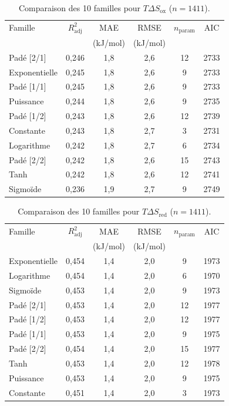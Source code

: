 \begin{table}[htbp]
\centering
\footnotesize
\caption{Comparaison des 10 familles pour $T\Delta S_{\mathrm{ox}}$ ($n = 1411$).}
\label{tab:s4_tds_ox_families}
\begin{tabular}{lccccc}
\toprule
Famille & $R^2_{\mathrm{adj}}$ & MAE & RMSE & $n_{\mathrm{param}}$ & AIC \\
 & & (kJ/mol) & (kJ/mol) & & \\
\midrule
Padé [2/1] & 0,246 & 1,8 & 2,6 & 12 & 2733 \\
Exponentielle & 0,245 & 1,8 & 2,6 & 9 & 2733 \\
Padé [1/1] & 0,245 & 1,8 & 2,6 & 9 & 2733 \\
Puissance & 0,244 & 1,8 & 2,6 & 9 & 2735 \\
Padé [1/2] & 0,243 & 1,8 & 2,6 & 12 & 2739 \\
Constante & 0,243 & 1,8 & 2,7 & 3 & 2731 \\
Logarithme & 0,242 & 1,8 & 2,7 & 6 & 2734 \\
Padé [2/2] & 0,242 & 1,8 & 2,6 & 15 & 2743 \\
Tanh & 0,242 & 1,8 & 2,6 & 12 & 2741 \\
Sigmoïde & 0,236 & 1,9 & 2,7 & 9 & 2749 \\
\bottomrule
\end{tabular}
\end{table}

\begin{table}[htbp]
\centering
\footnotesize
\caption{Comparaison des 10 familles pour $T\Delta S_{\mathrm{red}}$ ($n = 1411$).}
\label{tab:s4_tds_red_families}
\begin{tabular}{lccccc}
\toprule
Famille & $R^2_{\mathrm{adj}}$ & MAE & RMSE & $n_{\mathrm{param}}$ & AIC \\
 & & (kJ/mol) & (kJ/mol) & & \\
\midrule
Exponentielle & 0,454 & 1,4 & 2,0 & 9 & 1973 \\
Logarithme & 0,454 & 1,4 & 2,0 & 6 & 1970 \\
Sigmoïde & 0,453 & 1,4 & 2,0 & 9 & 1973 \\
Padé [2/1] & 0,453 & 1,4 & 2,0 & 12 & 1977 \\
Padé [1/2] & 0,453 & 1,4 & 2,0 & 12 & 1977 \\
Padé [1/1] & 0,453 & 1,4 & 2,0 & 9 & 1975 \\
Padé [2/2] & 0,454 & 1,4 & 2,0 & 15 & 1977 \\
Tanh & 0,453 & 1,4 & 2,0 & 12 & 1978 \\
Puissance & 0,453 & 1,4 & 2,0 & 9 & 1975 \\
Constante & 0,451 & 1,4 & 2,0 & 3 & 1973 \\
\bottomrule
\end{tabular}
\end{table}

